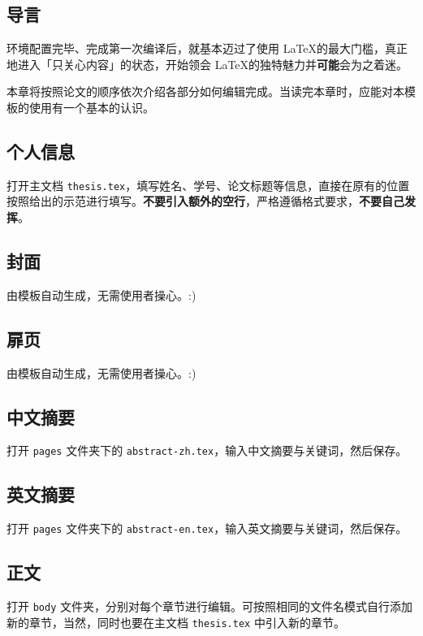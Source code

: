 \subsection{导言}

环境配置完毕、完成第一次编译后，就基本迈过了使用 \LaTeX 的最大门槛，真正地进入「只关心内容」的状态，开始领会 \LaTeX 的独特魅力并\textbf{可能}会为之着迷。

本章将按照论文的顺序依次介绍各部分如何编辑完成。当读完本章时，应能对本模板的使用有一个基本的认识。

\subsection{个人信息}

打开主文档 \texttt{thesis.tex}，填写姓名、学号、论文标题等信息，直接在原有的位置按照给出的示范进行填写。\textbf{不要引入额外的空行}，严格遵循格式要求，\textbf{不要自己发挥}。

\subsection{封面}

由模板自动生成，无需使用者操心。:)

\subsection{扉页}

由模板自动生成，无需使用者操心。:)

\subsection{中文摘要}

打开 \texttt{pages} 文件夹下的 \texttt{abstract-zh.tex}，输入中文摘要与关键词，然后保存。

\subsection{英文摘要}

打开 \texttt{pages} 文件夹下的 \texttt{abstract-en.tex}，输入英文摘要与关键词，然后保存。

\subsection{正文}

打开 \texttt{body} 文件夹，分别对每个章节进行编辑。可按照相同的文件名模式自行添加新的章节，当然，同时也要在主文档 \texttt{thesis.tex} 中引入新的章节。

